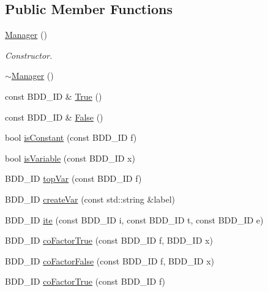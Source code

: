 \subsection*{Public Member Functions}
\begin{DoxyCompactItemize}
\item 
\hyperlink{classClassProject_1_1Manager_a1658ff9f18e38ccd9cb8b0b371b9c20b}{Manager} ()
\begin{DoxyCompactList}\small\item\em Constructor. \end{DoxyCompactList}\item 
\hyperlink{classClassProject_1_1Manager_a322cad25d7007438b3a043ad02253d29}{$\sim$\+Manager} ()
\item 
const B\+D\+D\+\_\+\+ID \& \hyperlink{classClassProject_1_1Manager_a0c15aff167a7019502b66100c4ec0a33}{True} ()
\item 
const B\+D\+D\+\_\+\+ID \& \hyperlink{classClassProject_1_1Manager_ae9bae01509e6063313024cd85a8eb569}{False} ()
\item 
bool \hyperlink{classClassProject_1_1Manager_a98fe06b67d8114f1404a7b19dddc935b}{is\+Constant} (const B\+D\+D\+\_\+\+ID f)
\item 
bool \hyperlink{classClassProject_1_1Manager_af026f76f68823bb9083f161b5db9e58b}{is\+Variable} (const B\+D\+D\+\_\+\+ID x)
\item 
B\+D\+D\+\_\+\+ID \hyperlink{classClassProject_1_1Manager_a8ddf48759e4e3a5c9e92b07470372b7e}{top\+Var} (const B\+D\+D\+\_\+\+ID f)
\item 
B\+D\+D\+\_\+\+ID \hyperlink{classClassProject_1_1Manager_a9fb480d8af44c75ee2b35b85f7038e68}{create\+Var} (const std\+::string \&label)
\item 
B\+D\+D\+\_\+\+ID \hyperlink{classClassProject_1_1Manager_ab6b8135aadc0a5b91b5c651c4046da05}{ite} (const B\+D\+D\+\_\+\+ID i, const B\+D\+D\+\_\+\+ID t, const B\+D\+D\+\_\+\+ID e)
\item 
B\+D\+D\+\_\+\+ID \hyperlink{classClassProject_1_1Manager_aa2bfdbb0fae8e09b2b766336cdf7ce94}{co\+Factor\+True} (const B\+D\+D\+\_\+\+ID f, B\+D\+D\+\_\+\+ID x)
\item 
B\+D\+D\+\_\+\+ID \hyperlink{classClassProject_1_1Manager_aea635ff0e0ec0cc8b43799f2d18de598}{co\+Factor\+False} (const B\+D\+D\+\_\+\+ID f, B\+D\+D\+\_\+\+ID x)
\item 
B\+D\+D\+\_\+\+ID \hyperlink{classClassProject_1_1Manager_ab2b73e9169e978c45a4ebf9aa3bddef8}{co\+Factor\+True} (const B\+D\+D\+\_\+\+ID f)
\item 

\end{DoxyCompactItemize}

